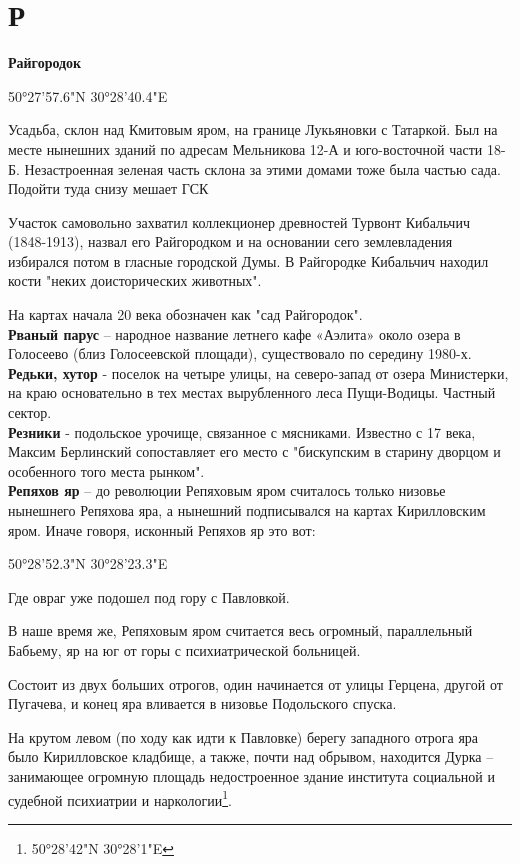 \chapter*{Р}

\textbf{Райгородок}

50°27'57.6"N 30°28'40.4"E

Усадьба, склон над Кмитовым яром, на границе Лукьяновки с Татаркой. Был на месте нынешних зданий по адресам Мельникова 12-А и юго-восточной части 18-Б. Незастроенная зеленая часть склона за этими домами тоже была частью сада. Подойти туда снизу мешает ГСК

Участок самовольно захватил коллекционер древностей Турвонт Кибальчич (1848-1913), назвал его Райгородком и на основании сего землевладения избирался потом в гласные городской Думы. В Райгородке Кибальчич находил кости "неких доисторических животных".

На картах начала 20 века обозначен как "сад Райгородок".\\


\textbf{Рваный парус} – народное название летнего кафе «Аэлита» около озера в Голосеево (близ Голосеевской площади), существовало по середину 1980-х.\\

\textbf{Редьки, хутор} - поселок на четыре улицы, на северо-запад от озера Министерки, на краю основательно в тех  местах вырубленного леса Пущи-Водицы. Частный сектор.\\

\textbf{Резники} - подольское урочище, связанное с мясниками. Известно с 17 века, Максим Берлинский сопоставляет его место с "бискупским в старину дворцом и особенного того места рынком".\\ 

\textbf{Репяхов яр} – до революции Репяховым яром считалось только низовье нынешнего Репяхова яра, а нынешний подписывался на картах Кирилловским яром. Иначе говоря, исконный Репяхов яр это вот:

50°28'52.3"N 30°28'23.3"E

Где овраг уже подошел под гору с Павловкой.

В наше время же, Репяховым яром считается весь огромный, параллельный Бабьему, яр на юг от горы с психиатрической больницей.

Состоит из двух больших отрогов, один начинается от улицы Герцена, другой от Пугачева, и конец яра вливается в низовье Подольского спуска.

На крутом левом (по ходу как идти к Павловке) берегу западного отрога яра было Кирилловское кладбище, а также, почти над обрывом, находится Дурка – занимающее огромную площадь недостроенное здание института социальной и судебной психиатрии и наркологии\footnote{50°28'42"N 30°28'1"E}.

